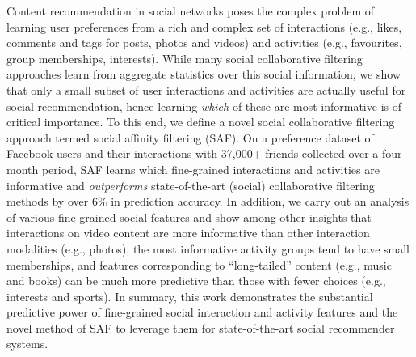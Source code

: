 %

Content recommendation in social networks poses the complex problem of
learning user preferences from a rich and complex set of interactions
(e.g., likes, comments and tags for posts, photos and videos) and
activities (e.g., favourites, group memberships, interests).  While
many social collaborative filtering approaches learn from aggregate
statistics over this social information, we show that only a small
subset of user interactions and activities are actually useful for
social recommendation, hence learning \emph{which} of these are most
informative is of critical importance.  To this end, we define a novel
social collaborative filtering approach termed social affinity
filtering (SAF).  On a preference dataset of Facebook users and their
interactions with 37,000+ friends collected over a four month period,
SAF learns which fine-grained interactions and activities are
informative and \emph{outperforms} state-of-the-art (social)
collaborative filtering methods by over 6\% in prediction accuracy.
In addition, we carry out an analysis of various fine-grained social
features and show among other insights that interactions on video
content are more informative than other interaction modalities (e.g.,
photos), the most informative activity groups tend to have small
memberships, and features corresponding to ``long-tailed'' content
(e.g., music and books) can be much more predictive than those with
fewer choices (e.g., interests and sports).  In summary, this work
demonstrates the substantial predictive power of fine-grained social
interaction and activity features and the novel method of SAF to
leverage them for state-of-the-art social recommender systems.


